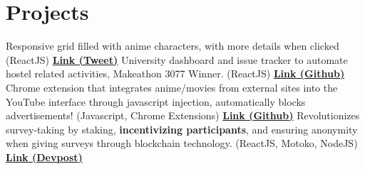 \section{Projects}
  \resumeSubHeadingListStart
      {Responsive grid filled with anime characters, with more details when clicked (ReactJS) \href{https://twitter.com/chuckncheese5/status/1726146879774507156}{\textbf{Link (Tweet)}}}
      {University dashboard and issue tracker to automate hostel related activities, Makeathon 3077 Winner. (ReactJS) \href{https://github.com/hari01584/project__UNIAutoMate__MakeAThon3077}{\textbf{Link (Github)}}}
      {Chrome extension that integrates anime/movies from external sites into the YouTube interface through javascript injection, automatically blocks advertisements! (Javascript, Chrome Extensions) \href{https://github.com/hari01584/many-more-yt-extender}{\textbf{Link (Github)}}}
      {Revolutionizes survey-taking by staking, \textbf{incentivizing participants}, and ensuring anonymity when giving surveys through blockchain technology. (ReactJS, Motoko, NodeJS) \href{https://devpost.com/software/desu-decentralised-survey-app}{\textbf{Link (Devpost)}}}
  \resumeSubHeadingListEnd